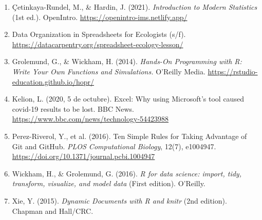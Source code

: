 \begin{refsection}
\begin{enumerate}
\item Çetinkaya-Rundel, M., \& Hardin, J. (2021). \emph{Introduction to Modern Statistics} (1st ed.). OpenIntro. \url{https://openintro-ims.netlify.app/}
\item Data Organization in Spreadsheets for Ecologists (s/f). \url{https://datacarpentry.org/spreadsheet-ecology-lesson/}
\item Grolemund, G., \& Wickham, H. (2014). \emph{Hands-On Programming with R: Write Your Own Functions and Simulations.} O'Reilly Media. \url{https://rstudio-education.github.io/hopr/}
\item Kelion, L. (2020, 5 de octubre). Excel: Why using Microsoft's tool caused covid-19 results to be lost. BBC News. \url{https://www.bbc.com/news/technology-54423988}
\item Perez-Riverol, Y., et al. (2016). Ten Simple Rules for Taking Advantage of Git and GitHub. \emph{PLOS Computational Biology}, 12(7), e1004947. \url{https://doi.org/10.1371/journal.pcbi.1004947}
\item Wickham, H., \& Grolemund, G. (2016). \emph{R for data science: import, tidy, transform, visualize, and model data} (First edition). O'Reilly.
\item Xie, Y. (2015). \emph{Dynamic Documents with R and knitr} (2nd edition). Chapman and Hall/CRC.
\end{enumerate}

\end{refsection}
